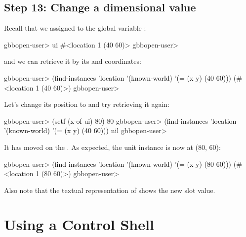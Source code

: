 \documentclass[10pt,twoside,english,pdftex]{article}
\begin{document}
\subsection*{Step 13: Change a dimensional value}

%
%
Recall that we assigned   to the global variable
:
%
\W\supp
\begin{example}
\textcolor{darkergray}{%
  gbbopen-user> \textcolor{black}{ui}
  #<location 1 (40 60)>
  gbbopen-user>}
\end{example}
%  
and we can retrieve it by its  and  coordinates:
%
\W\supp\notpretop
\begin{example}
\textcolor{darkergray}{%
  gbbopen-user> \textcolor{black}{(find-instances 'location '(known-world)
                  '(= (x y) (40 60)))}
  (#<location 1 (40 60)>)
  gbbopen-user>}
\end{example}

%
%
Let's change its  position to  and try retrieving it again:
%
\W\supp
\begin{example}
\textcolor{darkergray}{%
  gbbopen-user> \textcolor{black}{(setf (x-of ui) 80)}
  80
  gbbopen-user> \textcolor{black}{(find-instances 'location '(known-world)
                  '(= (x y) (40 60)))}
  nil
  gbbopen-user>}
\end{example}
%
It has moved on the .  As expected, the
  unit instance is now at (80, 60):
%
\W\supp\notpretop
\begin{example}
\textcolor{darkergray}{%
  gbbopen-user> \textcolor{black}{(find-instances 'location '(known-world)
                  '(= (x y) (80 60)))}
  (#<location 1 (80 60)>)
  gbbopen-user>}
\end{example}
%
Also note that the textual representation of  
shows the new  slot value.


\T\markright{}%
\T\pagestyle{plain}
\T\cleardoublepage
\W{}
\T\pagestyle{fancy}
\T\thispagestyle{fancybottom}
\T\renewcommand{\headrulewidth}{0pt}
\section{Using a Control Shell}
\label{sec:control-shell}%
\end{document}
